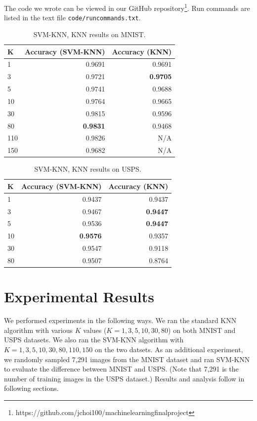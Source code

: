 \documentclass[11pt,letterpaper]{article}
\begin{document}
The code we wrote can be viewed in our GitHub repository\footnote{https://github.com/jchoi100/machine\textunderscore learning\textunderscore final\textunderscore project}. Run commands are listed in the text file {\tt code/run\textunderscore commands.txt}.

\begin{table}
\begin{center}
\begin{tabular}{|l|r|r|}
\hline \bf K & \bf Accuracy (SVM-KNN) & \bf Accuracy (KNN)\\ \hline
1 & 0.9691 & 0.9691 \\
3 & 0.9721 & \textbf{0.9705} \\
5 & 0.9741 & 0.9688 \\
10 & 0.9764 & 0.9665 \\
30 & 0.9815 & 0.9596 \\
80 & \textbf{0.9831} & 0.9468 \\
110 & 0.9826& N/A \\
150 & 0.9682 & N/A \\
\hline
\end{tabular}
\end{center}
\caption{\label{svm-knn-mnist} SVM-KNN, KNN results on MNIST. }
\end{table}

\begin{table}
\begin{center}
\begin{tabular}{|l|r|r|}
\hline \bf K & \bf Accuracy (SVM-KNN) & \bf Accuracy (KNN)\\ \hline
1 & 0.9437 & 0.9437\\
3 & 0.9467 & \textbf{0.9447}\\
5 & 0.9536 & \textbf{0.9447}\\
10 & \textbf{0.9576} & 0.9357\\
30 & 0.9547 & 0.9118\\
80 & 0.9507 & 0.8764\\
\hline
\end{tabular}
\end{center}
\caption{\label{knn-mnist} SVM-KNN, KNN results on USPS. }
\end{table}

\section{Experimental Results}

We performed experiments in the following ways. We ran the standard KNN algorithm with various $K$ values ($K=1,3,5,10,30,80$) on both MNIST and USPS datasets. We also ran the SVM-KNN algorithm with $K=1,3,5,10,30,80,110,150$ on the two datsets. As an additional experiment, we randomly sampled 7,291 images from the MNIST dataset and ran SVM-KNN to evaluate the difference between MNIST and USPS. (Note that 7,291 is the number of training images in the USPS dataset.) Results and analysis follow in following sections.
\end{document}
